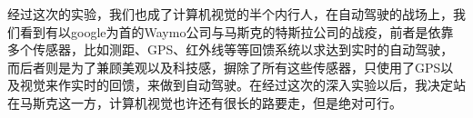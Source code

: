 \documentclass[journal,transmag]{IEEEtran}
\begin{document}
经过这次的实验，我们也成了计算机视觉的半个内行人，在自动驾驶的战场上，我们看到有以google为首的Waymo公司与马斯克的特斯拉公司的战疫，前者是依靠多个传感器，比如测距、GPS、红外线等等回馈系统以求达到实时的自动驾驶，而后者则是为了兼顾美观以及科技感，摒除了所有这些传感器，只使用了GPS以及视觉来作实时的回馈，来做到自动驾驶。在经过这次的深入实验以后，我决定站在马斯克这一方，计算机视觉也许还有很长的路要走，但是绝对可行。



%
%



%
%
\end{document}
